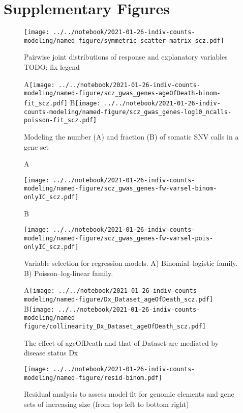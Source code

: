 \documentclass[letterpaper]{article}
\begin{document}
\section*{Supplementary Figures}

\setcounter{figure}{0}
\makeatletter 
\renewcommand{\figurename}{Supplementary Figure} %
\makeatother

\begin{figure}[p]
\begin{center}
\texttt{[image: ../../notebook/2021-01-26-indiv-counts-modeling/named-figure/symmetric-scatter-matrix\_scz.pdf]}
\end{center}
\caption{
Pairwise joint distributions of response and explanatory variables TODO: fix legend
}
\label{fig:scattermatrix}
\end{figure}

\begin{figure}[p]
\begin{center}
A\texttt{[image: ../../notebook/2021-01-26-indiv-counts-modeling/named-figure/scz\_gwas\_genes-ageOfDeath-binom-fit\_scz.pdf]}
B\texttt{[image: ../../notebook/2021-01-26-indiv-counts-modeling/named-figure/scz\_gwas\_genes-log10\_ncalls-poisson-fit\_scz.pdf]}
\end{center}
\caption{
Modeling the number (A) and fraction (B) of somatic SNV calls in a gene set
}
\label{fig:fitted-lines}
\end{figure}

\begin{figure}[p]
\begin{center}
A

\texttt{[image: ../../notebook/2021-01-26-indiv-counts-modeling/named-figure/scz\_gwas\_genes-fw-varsel-binom-onlyIC\_scz.pdf]}

B

\texttt{[image: ../../notebook/2021-01-26-indiv-counts-modeling/named-figure/scz\_gwas\_genes-fw-varsel-pois-onlyIC\_scz.pdf]}
\end{center}
\caption{
Variable selection for regression models. A) Binomial--logistic
family.  B) Poisson--log-linear family.
}
\label{fig:varsel}
\end{figure}

\begin{figure}[p]
\begin{center}
A\texttt{[image: ../../notebook/2021-01-26-indiv-counts-modeling/named-figure/Dx\_Dataset\_ageOfDeath\_scz.pdf]}
B\texttt{[image: ../../notebook/2021-01-26-indiv-counts-modeling/named-figure/collinearity\_Dx\_Dataset\_ageOfDeath\_scz.pdf]}
\end{center}
\caption{
The effect of ageOfDeath and that of Dataset are mediated by disease status Dx
}
\label{fig:d-separation}
\end{figure}

\begin{figure}[p]
\texttt{[image: ../../notebook/2021-01-26-indiv-counts-modeling/named-figure/resid-binom.pdf]}
\caption{
Residual analysis to assess model fit for genomic elements and gene
sets of increasing size (from top left to bottom right)
}
\label{fig:residual-QQ}
\end{figure}
\end{document}
